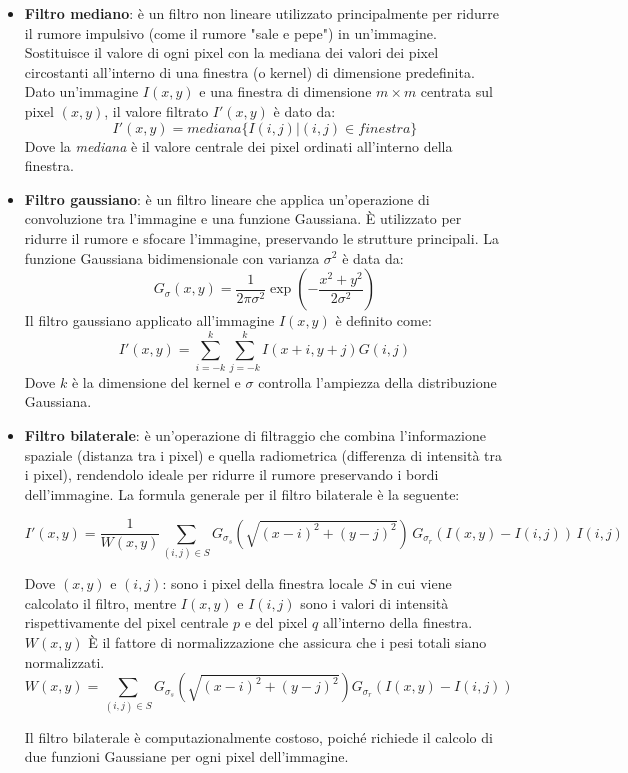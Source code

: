 \begin{itemize}
    \item \textbf{Filtro mediano}: è un filtro non lineare utilizzato principalmente per ridurre il rumore impulsivo (come il rumore "sale e pepe") in un'immagine. Sostituisce il valore di ogni pixel con la mediana dei valori dei pixel circostanti all'interno di una finestra (o kernel) di dimensione predefinita.
    Dato un'immagine $I(x,y)$ e una finestra di dimensione $m\times m$ centrata sul pixel $(x,y)$, il valore filtrato $I'(x,y)$ è dato da:
    $$
    I'(x,y)=mediana\{I(i,j)|(i,j) \in finestra\}
    $$
    Dove la \textit{mediana} è il valore centrale dei pixel ordinati all'interno della finestra.
    
    \item \textbf{Filtro gaussiano}: è un filtro lineare che applica un'operazione di convoluzione tra l'immagine e una funzione Gaussiana. È utilizzato per ridurre il rumore e sfocare l'immagine, preservando le strutture principali. La funzione Gaussiana bidimensionale con varianza $\sigma^2$ è data da:
    $$
    G_{\sigma}(x,y)=\dfrac{1}{2\pi\sigma^2}\exp{\left(-\dfrac{x^2+y^2}{2\sigma^2}\right)}
    $$
    Il filtro gaussiano applicato all'immagine $I(x,y)$ è definito come:
    $$
    I'(x,y)=\sum_{i=-k}^{k}\sum_{j=-k}^{k}I(x+i,y+j)G(i,j)
    $$
    Dove $k$ è la dimensione del kernel e $\sigma$ controlla l'ampiezza della distribuzione Gaussiana.
    \item \textbf{Filtro bilaterale}: è un'operazione di filtraggio che combina l'informazione spaziale (distanza tra i pixel) e quella radiometrica (differenza di intensità tra i pixel), rendendolo ideale per ridurre il rumore preservando i bordi dell'immagine. La formula generale per il filtro bilaterale è la seguente:
    
    $$
    I'(x,y) = \frac{1}{W(x,y)} \sum_{(i,j) \in S} G_{\sigma_s}\left(\sqrt{(x - i)^2 + (y - j)^2}\right) \, G_{\sigma_r}(I(x,y) - I(i,j)) \, I(i,j)
    $$
    
    Dove $(x,y)$ e $(i,j)$: sono i pixel della finestra locale $S$ in cui viene calcolato il filtro, mentre $I(x,y)$ e $I(i,j)$ sono i valori di intensità rispettivamente del pixel centrale $p$ e del pixel $q$ all'interno della finestra. $W(x,y)$ È il fattore di normalizzazione che assicura che i pesi totali siano normalizzati.
    $$
    W(x,y) = \sum_{(i,j) \in S} G_{\sigma_s}\left(\sqrt{(x - i)^2 + (y - j)^2}\right) G_{\sigma_r}(I(x,y) - I(i,j))
    $$

    Il filtro bilaterale è computazionalmente costoso, poiché richiede il calcolo di due funzioni Gaussiane per ogni pixel dell'immagine.
    
\end{itemize}

